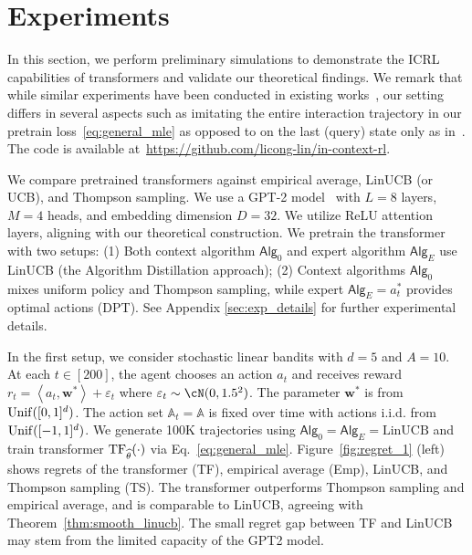 \documentclass[10pt]{article}
\newcommand{\eps}{\varepsilon}
\newcommand{\<}{\left\langle}
\renewcommand{\>}{\right\rangle}
\newcommand{\TF}{{\rm TF}}
\newcommand{\LinUCB}{{\mathrm{LinUCB}}}
\newcommand{\action}{{a}}
\newcommand{\reward}{{r}}
\newcommand{\sAlg}{{\mathsf{Alg}}}
\newcommand{\EstPar}{{\widehat{\theta}}}
\newcommand{\shortexp}{{E}}
\def\sA{{\mathbb{A}}}
\def\bw{{\mathbf w}}
\begin{document}
\section{Experiments}
\label{sec:experiments}






In this section, we perform preliminary simulations to demonstrate the ICRL capabilities of transformers and validate our theoretical findings. We remark that while similar experiments have been conducted in existing works~\citep{laskin2022context,lee2023supervised}, our setting differs in several aspects such as imitating the entire interaction trajectory in our pretrain loss~\eqref{eq:general_mle} as opposed to on the last (query) state only as in~\citet{lee2023supervised}. The code is available at~\href{https://github.com/licong-lin/in-context-rl}{https://github.com/licong-lin/in-context-rl}.





We compare pretrained transformers against empirical average, LinUCB (or UCB), and Thompson sampling. We use a GPT-2 model~\cite{garg2022can,lee2023supervised} with $L = 8$ layers, $M=4$ heads, and embedding dimension $D=32$. We utilize ReLU attention layers, aligning with our theoretical construction. We pretrain the transformer with two setups: (1) Both context algorithm $\sAlg_0$ and expert algorithm $\sAlg_{\shortexp}$ use LinUCB (the Algorithm Distillation approach); (2) Context algorithms $\sAlg_0$ mixes uniform policy and Thompson sampling, while expert $\sAlg_{\shortexp} = \action_t^*$ provides optimal actions (DPT). See Appendix \ref{sec:exp_details} for further experimental details. 



In the first setup, we consider stochastic linear bandits with $d=5$ and $A=10$. At each $t \in [200]$, the agent chooses an action $\action_t$ and receives reward $\reward_t=\<\action_t,\bw^*\>+\eps_t$ where $\eps_t\sim\cN(0,1.5^2)$. The parameter $\bw^*$ is from ${\rm Unif}([0,1]^d)$. The action set $\sA_t=\sA$ is fixed over time with actions i.i.d. from ${\rm Unif}([-1, 1]^d)$. We generate 100K trajectories using $\sAlg_0=\sAlg_{\shortexp}=\LinUCB$ and train transformer $\TF_\EstPar(\cdot)$ via Eq.~\eqref{eq:general_mle}. Figure~\ref{fig:regret_1} (left) shows regrets of the transformer (TF), empirical average (Emp), LinUCB, and Thompson sampling (TS). The transformer outperforms Thompson sampling and empirical average, and is comparable to LinUCB, agreeing with Theorem~\ref{thm:smooth_linucb}. The small regret gap between TF and LinUCB may stem from the limited capacity of the GPT2 model.
\end{document}

